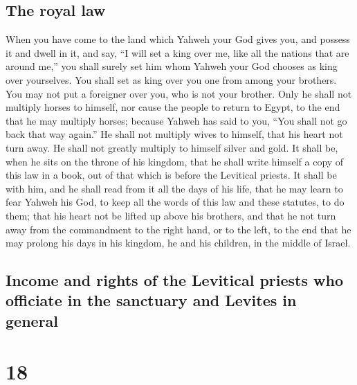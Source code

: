 \hypertarget{the-royal-law}{%
\subsection{The royal law}\label{the-royal-law}}

 When you have come to the land which Yahweh your God
gives you, and possess it and dwell in it, and say, ``I will set a king
over me, like all the nations that are around me,''  you
shall surely set him whom Yahweh your God chooses as king over
yourselves. You shall set as king over you one from among your brothers.
You may not put a foreigner over you, who is not your brother.
 Only he shall not multiply horses to himself, nor cause
the people to return to Egypt, to the end that he may multiply horses;
because Yahweh has said to you, ``You shall not go back that way
again.''  He shall not multiply wives to himself, that
his heart not turn away. He shall not greatly multiply to himself silver
and gold.  It shall be, when he sits on the throne of his
kingdom, that he shall write himself a copy of this law in a book, out
of that which is before the Levitical priests.  It shall
be with him, and he shall read from it all the days of his life, that he
may learn to fear Yahweh his God, to keep all the words of this law and
these statutes, to do them;  that his heart not be lifted
up above his brothers, and that he not turn away from the commandment to
the right hand, or to the left, to the end that he may prolong his days
in his kingdom, he and his children, in the middle of Israel.

\hypertarget{income-and-rights-of-the-levitical-priests-who-officiate-in-the-sanctuary-and-levites-in-general}{%
\subsection{Income and rights of the Levitical priests who officiate in
the sanctuary and Levites in
general}\label{income-and-rights-of-the-levitical-priests-who-officiate-in-the-sanctuary-and-levites-in-general}}

\hypertarget{section-17}{%
\section{18}\label{section-17}}


